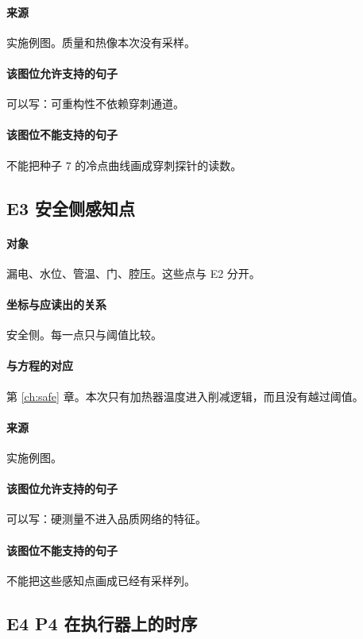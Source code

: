 \paragraph{来源}
实施例图。质量和热像本次没有采样。

\paragraph{该图位允许支持的句子}
可以写：可重构性不依赖穿刺通道。

\paragraph{该图位不能支持的句子}
不能把种子 7 的冷点曲线画成穿刺探针的读数。

\subsection{E3 安全侧感知点}
\paragraph{对象}
漏电、水位、管温、门、腔压。这些点与 E2 分开。

\paragraph{坐标与应读出的关系}
安全侧。每一点只与阈值比较。

\paragraph{与方程的对应}
第 \ref{ch:safe} 章。本次只有加热器温度进入削减逻辑，而且没有越过阈值。

\paragraph{来源}
实施例图。

\paragraph{该图位允许支持的句子}
可以写：硬测量不进入品质网络的特征。

\paragraph{该图位不能支持的句子}
不能把这些感知点画成已经有采样列。

\subsection{E4 P4 在执行器上的时序}
